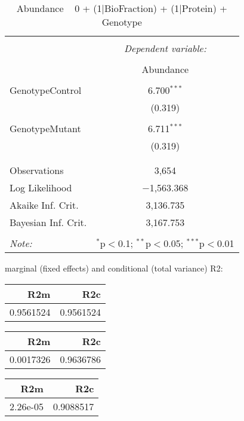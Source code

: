 \documentclass[11pt]{report}
\begin{document}
\begin{table}[!htbp] \centering 
  \caption{Abundance ~ 0 + (1|BioFraction) + (1|Protein) + Genotype} 
  \label{} 
\begin{tabular}{@{\extracolsep{5pt}}lc} 
\\[-1.8ex]\hline 
\hline \\[-1.8ex] 
 & \multicolumn{1}{c}{\textit{Dependent variable:}} \\ 
\cline{2-2} 
\\[-1.8ex] & Abundance \\ 
\hline \\[-1.8ex] 
 GenotypeControl & 6.700$^{***}$ \\ 
  & (0.319) \\ 
  & \\ 
 GenotypeMutant & 6.711$^{***}$ \\ 
  & (0.319) \\ 
  & \\ 
\hline \\[-1.8ex] 
Observations & 3,654 \\ 
Log Likelihood & $-$1,563.368 \\ 
Akaike Inf. Crit. & 3,136.735 \\ 
Bayesian Inf. Crit. & 3,167.753 \\ 
\hline 
\hline \\[-1.8ex] 
\textit{Note:}  & \multicolumn{1}{r}{$^{*}$p$<$0.1; $^{**}$p$<$0.05; $^{***}$p$<$0.01} \\ 
\end{tabular} 
\end{table} 
marginal (fixed effects) and conditional (total variance) R2:

\begin{tabular}{r|r}
\hline
R2m & R2c\\
\hline
0.9561524 & 0.9561524\\
\hline
\end{tabular}

\begin{tabular}{r|r}
\hline
R2m & R2c\\
\hline
0.0017326 & 0.9636786\\
\hline
\end{tabular}

\begin{tabular}{r|r}
\hline
R2m & R2c\\
\hline
2.26e-05 & 0.9088517\\
\hline
\end{tabular}
\end{document}
